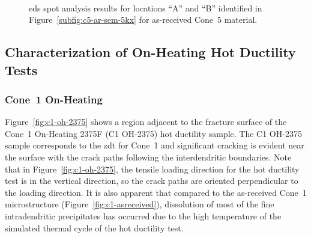 \begin{figure}
\centering
{} \\
\caption[]{\Gls{eds} spot analysis results for locations ``A'' and ``B'' identified in Figure~\ref{subfig:c5-ar-sem-5kx} for as-received Cone~5 material.}
\label{fig:c5-ar-eds}
\end{figure}


\subsection{Characterization of On-Heating Hot Ductility Tests}
\subsubsection{Cone~1 On-Heating}
Figure~\ref{fig:c1-oh-2375} shows a region adjacent to the fracture surface of the Cone~1 On-Heating 2375\textdegree{}F (C1 OH-2375) hot ductility sample. The C1 OH-2375 sample corresponds to the \gls{zdt} for Cone~1 and significant cracking is evident near the surface with the crack paths following the interdendritic boundaries. Note that in Figure~\ref{fig:c1-oh-2375}, the tensile loading direction for the hot ductility test is in the vertical direction, so the crack paths are oriented perpendicular to the loading direction. It is also apparent that compared to the as-received Cone~1 microstructure (Figure~\ref{fig:c1-asreceived}), dissolution of most of the fine intradendritic precipitates has occurred due to the high temperature of the simulated thermal cycle of the hot ductility test.

